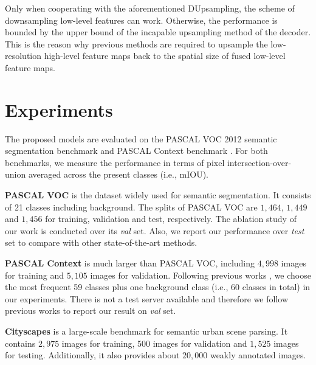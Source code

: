 \documentclass[10pt,twocolumn,letterpaper]{article}
\newcommand{\1}{{\mathbbm{1}}}
\begin{document}
Only when cooperating with the aforementioned DUpsampling, the scheme of downsampling low-level features can work. Otherwise, the performance is bounded by the upper bound of the incapable upsampling method of the decoder.
This is the reason why previous methods are required to upsample the low-resolution high-level feature maps back to the spatial size of fused low-level feature maps.



\section{Experiments}

The proposed models are evaluated on the PASCAL VOC 2012 semantic segmentation benchmark \cite{everingham2010pascal} and PASCAL Context benchmark \cite{mottaghi2014role}. For both benchmarks, we measure the performance in terms of pixel intersection-over-union averaged across the present classes (i.e., mIOU).

\textbf{PASCAL VOC} is the  dataset widely used for semantic segmentation. It consists of 21 classes including background. The splits of PASCAL VOC are $1, 464$, $1, 449$ and $1, 456$ for training, validation and test, respectively. The ablation study of our work is conducted over its {\it val} set. Also, we report our performance over {\it test} set to compare with other state-of-the-art methods.

\textbf{PASCAL Context} is much larger than PASCAL VOC,
including $4, 998$ images for training and $5, 105$ images for validation. Following previous works \cite{lin2017refinenet, mottaghi2014role}, we choose the most frequent 59 classes plus one background class (i.e., 60 classes in total) in our experiments. There is not a test server available and therefore we follow previous works \cite{lin2017refinenet, zhang2018context, chen2018deeplab, long2015fully, zheng2015conditional} to report our result on {\it val} set.

\textbf{Cityscapes} is a large-scale benchmark for semantic urban scene parsing. It contains $2, 975$ images for training, 500 images for validation and $1, 525$ images for testing. Additionally, it also provides about $20,000$ weakly annotated images.
\end{document}

